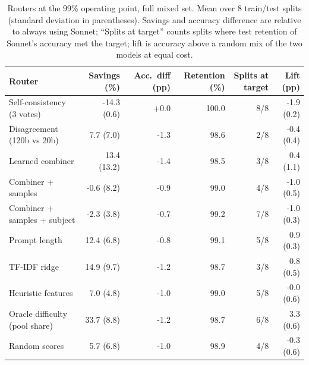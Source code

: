 \begin{table}[!htbp]
\centering\small
\caption{Routers at the 99\% operating point, full mixed set. Mean over 8 train/test splits (standard deviation in parentheses). Savings and accuracy difference are relative to always using Sonnet; ``Splits at target'' counts splits where test retention of Sonnet's accuracy met the target; lift is accuracy above a random mix of the two models at equal cost.}\label{tab:99_full}
\begin{tabular}{lrrrrr}
\toprule
Router & Savings (\%) & Acc.\ diff (pp) & Retention (\%) & Splits at target & Lift (pp) \\
\midrule
Self-consistency (3 votes) & -14.3 (0.6) & +0.0 & 100.0 & 8/8 & -1.9 (0.2) \\
Disagreement (120b vs 20b) & 7.7 (7.0) & -1.3 & 98.6 & 2/8 & -0.4 (0.4) \\
Learned combiner & 13.4 (13.2) & -1.4 & 98.5 & 3/8 & 0.4 (1.1) \\
Combiner + samples & -0.6 (8.2) & -0.9 & 99.0 & 4/8 & -1.0 (0.5) \\
Combiner + samples + subject & -2.3 (3.8) & -0.7 & 99.2 & 7/8 & -1.0 (0.3) \\
Prompt length & 12.4 (6.8) & -0.8 & 99.1 & 5/8 & 0.9 (0.3) \\
TF-IDF ridge & 14.9 (9.7) & -1.2 & 98.7 & 3/8 & 0.8 (0.5) \\
Heuristic features & 7.0 (4.8) & -1.0 & 99.0 & 5/8 & -0.0 (0.6) \\
Oracle difficulty (pool share) & 33.7 (8.8) & -1.2 & 98.7 & 6/8 & 3.3 (0.6) \\
Random scores & 5.7 (6.8) & -1.0 & 98.9 & 4/8 & -0.3 (0.6) \\
\bottomrule
\end{tabular}
\end{table}

